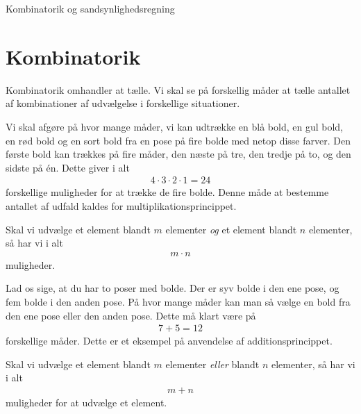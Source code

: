 \begin{center}
\Huge
Kombinatorik og sandsynlighedsregning
\end{center}

\section*{Kombinatorik}
Kombinatorik omhandler at tælle. Vi skal se på forskellig måder at tælle antallet af kombinationer af udvælgelse i forskellige situationer.

\begin{exa}
Vi skal afgøre på hvor mange måder, vi kan udtrække en blå bold, en gul bold, en rød bold og en sort bold fra en pose på fire bolde med netop disse farver. Den første bold kan trækkes på fire måder, den næste på tre, den tredje på to, og den sidste på én. Dette giver i alt
\begin{align*}
4\cdot 3\cdot 2\cdot 1 = 24
\end{align*}
forskellige muligheder for at trække de fire bolde. Denne måde at bestemme antallet af udfald kaldes for multiplikationsprincippet.
\end{exa}

\begin{defn}[Multiplikationsprincippet]
Skal vi udvælge et element blandt $m$ elementer \textit{og} et element blandt $n$ elementer, så har vi i alt
\begin{align*}
m\cdot n
\end{align*}
muligheder.
\end{defn}

\begin{exa}
Lad os sige, at du har to poser med bolde. Der er syv bolde i den ene pose, og fem bolde i den anden pose. På hvor mange måder kan man så vælge en bold fra den ene pose eller den anden pose. Dette må klart være på
\begin{align*}
7+5 = 12
\end{align*}
forskellige måder. Dette er et eksempel på anvendelse af additionsprincippet. 
\end{exa}
\begin{defn}[Additionsprincippet]
Skal vi udvælge et element blandt $m$ elementer \textit{eller} blandt $n$ elementer, så har vi i alt 
\begin{align*}
m+n
\end{align*}
muligheder for at udvælge et element. 
\end{defn}

